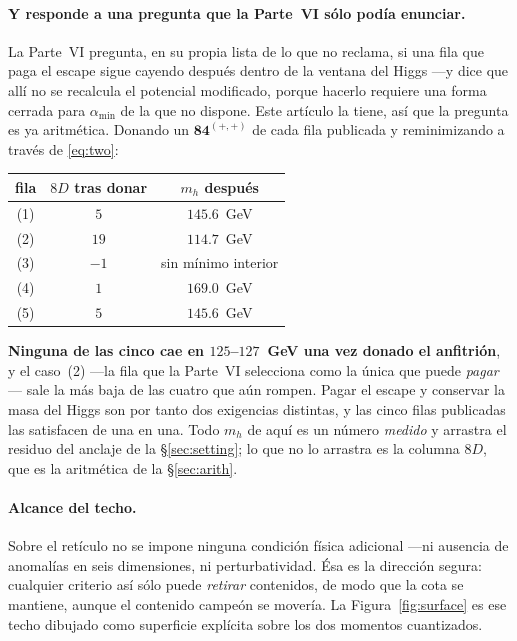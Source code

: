 \documentclass[11pt,a4paper]{article}
\newcommand{\rep}[1]{\mathbf{#1}}
\newcommand{\amin}{\alpha_{\min}}
\begin{document}
\paragraph{Y responde a una pregunta que la Parte~VI sólo podía enunciar.} La Parte~VI pregunta, en
su propia lista de lo que no reclama, si una fila que paga el escape sigue cayendo después dentro de
la ventana del Higgs ---y dice que allí no se recalcula el potencial modificado, porque hacerlo
requiere una forma cerrada para $\amin$ de la que no dispone. Este artículo la tiene, así que la
pregunta es ya aritmética. Donando un $\rep{84}^{(+,+)}$ de cada fila publicada y reminimizando a
través de \eqref{eq:two}:
\begin{center}\small
{}
\begin{tabular}{ccc}
\toprule
\rowcolor{hdrblue!10}fila & $8D$ tras donar & $m_h$ después\\
\midrule
\rowcolor{amber!12}(1) & $5$  & $145.6$~GeV\\
\rowcolor{amber!14}(2) & $19$ & $114.7$~GeV\\
\rowcolor{warmred!13}(3) & $-1$ & sin mínimo interior\\
\rowcolor{amber!12}(4) & $1$  & $169.0$~GeV\\
\rowcolor{amber!12}(5) & $5$  & $145.6$~GeV\\
\bottomrule
\end{tabular}
\end{center}
\noindent \textbf{Ninguna de las cinco cae en $125$--$127$~GeV una vez donado el anfitrión}, y el
caso~(2) ---la fila que la Parte~VI selecciona como la única que puede \emph{pagar}--- sale la más
baja de las cuatro que aún rompen. Pagar el escape y conservar la masa del Higgs son por tanto dos
exigencias distintas, y las cinco filas publicadas las satisfacen de una en una. Todo $m_h$ de aquí
es un número \emph{medido} y arrastra el residuo del anclaje de la \S\ref{sec:setting}; lo que no lo
arrastra es la columna $8D$, que es la aritmética de la \S\ref{sec:arith}.

\paragraph{Alcance del techo.} Sobre el retículo no se impone ninguna condición física adicional
---ni ausencia de anomalías en seis dimensiones, ni perturbatividad. Ésa es la dirección segura:
cualquier criterio así sólo puede \emph{retirar} contenidos, de modo que la cota se mantiene,
aunque el contenido campeón se movería. La Figura~\ref{fig:surface} es ese techo dibujado como
superficie explícita sobre los dos momentos cuantizados.
\end{document}
